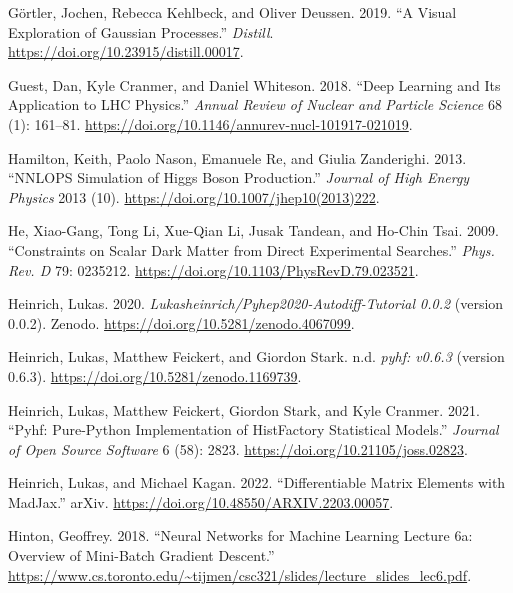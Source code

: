 \documentclass[
  11pt,
  numbers=noendperiod]{book}
\newlength{\cslhangindent}
\newlength{\cslentryspacingunit} %
\newenvironment{CSLReferences}[2] %
 {%
  \setlength{\parindent}{0pt}
  \ifodd #1
  \let\oldpar\par
  \def\par{\hangindent=\cslhangindent\oldpar}
  \fi
  \setlength{\parskip}{#2\cslentryspacingunit}
 }%
 {}
\begin{document}
\begin{CSLReferences}{1}{0}
\leavevmode{}%
Görtler, Jochen, Rebecca Kehlbeck, and Oliver Deussen. 2019. {``A Visual
Exploration of Gaussian Processes.''} \emph{Distill}.
\url{https://doi.org/10.23915/distill.00017}.

\leavevmode{}%
Guest, Dan, Kyle Cranmer, and Daniel Whiteson. 2018. {``Deep Learning
and Its Application to {LHC} Physics.''} \emph{Annual Review of Nuclear
and Particle Science} 68 (1): 161--81.
\url{https://doi.org/10.1146/annurev-nucl-101917-021019}.

\leavevmode{}%
Hamilton, Keith, Paolo Nason, Emanuele Re, and Giulia Zanderighi. 2013.
{``{NNLOPS} Simulation of Higgs Boson Production.''} \emph{Journal of
High Energy Physics} 2013 (10).
\url{https://doi.org/10.1007/jhep10(2013)222}.

\leavevmode{}%
He, Xiao-Gang, Tong Li, Xue-Qian Li, Jusak Tandean, and Ho-Chin Tsai.
2009. {``Constraints on Scalar Dark Matter from Direct Experimental
Searches.''} \emph{Phys. Rev. D} 79: 0235212.
\url{https://doi.org/10.1103/PhysRevD.79.023521}.

\leavevmode{}%
Heinrich, Lukas. 2020. \emph{Lukasheinrich/Pyhep2020-Autodiff-Tutorial
0.0.2} (version 0.0.2). Zenodo.
\url{https://doi.org/10.5281/zenodo.4067099}.

\leavevmode{}%
Heinrich, Lukas, Matthew Feickert, and Giordon Stark. n.d. \emph{{pyhf:
v0.6.3}} (version 0.6.3). \url{https://doi.org/10.5281/zenodo.1169739}.

\leavevmode{}%
Heinrich, Lukas, Matthew Feickert, Giordon Stark, and Kyle Cranmer.
2021. {``Pyhf: Pure-Python Implementation of HistFactory Statistical
Models.''} \emph{Journal of Open Source Software} 6 (58): 2823.
\url{https://doi.org/10.21105/joss.02823}.

\leavevmode{}%
Heinrich, Lukas, and Michael Kagan. 2022. {``Differentiable Matrix
Elements with MadJax.''} arXiv.
\url{https://doi.org/10.48550/ARXIV.2203.00057}.

\leavevmode{}%
Hinton, Geoffrey. 2018. {``Neural Networks for Machine Learning Lecture
6a: Overview of Mini-Batch Gradient Descent.''}
\url{https://www.cs.toronto.edu/~tijmen/csc321/slides/lecture_slides_lec6.pdf}.


\end{CSLReferences}
\end{document}
